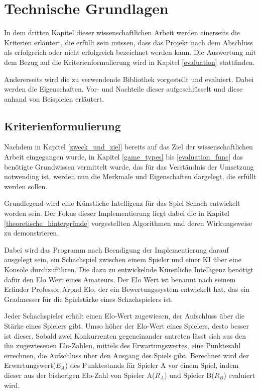
\chapter{Technische Grundlagen}
In dem dritten Kapitel dieser wissenschaftlichen Arbeit werden einerseits die Kriterien erläutert, die erfüllt sein müssen, dass das Projekt nach dem Abschluss als erfolgreich oder nicht erfolgreich bezeichnet werden kann. Die Auswertung mit dem Bezug auf die Kriterienformulierung wird in Kapitel \ref{evaluation} stattfinden.

Andererseits wird die zu verwendende Bibliothek vorgestellt und evaluiert. Dabei werden die Eigenschaften, Vor- und Nachteile dieser aufgeschlüsselt und diese anhand von Beispielen erläutert.


\section{Kriterienformulierung}\label{kriterienformulierung}
Nachdem in Kapitel \ref{zweck_und_ziel} bereits auf das Ziel der wissenschaftlichen Arbeit eingegangen wurde, in Kapitel \ref{game_types} bis \ref{evaluation_func} das benötigte Grundwissen vermittelt wurde, das für das Verständnis der Umsetzung notwending ist, werden nun die Merkmale und Eigenschaften dargelegt, die erfüllt werden sollen.

Grundlegend wird eine Künstliche Intelligenz für das Spiel Schach entwickelt worden sein. Der Fokus dieser Implementierung liegt dabei die in Kapitel \ref{theoretische_hintergründe} vorgestellten Algorithmen und deren Wirkungsweise zu demonstrieren.

Dabei wird das Programm nach Beendigung der Implementierung darauf ausgelegt sein, ein Schachspiel zwischen einem Spieler und einer KI über eine Konsole durchzuführen. Die dazu zu entwickelnde Künstliche Intelligenz benötigt dafür den Elo Wert eines Amateurs. Der Elo Wert ist benannt nach seinem Erfinder Professor Arpad Elo, der ein Bewertungssystem entwickelt hat, das ein Gradmesser für die Spielstärke eines Schachspielers ist.\cite{E.V.} 

Jeder Schachspieler erhält einen Elo-Wert zugewiesen, der Aufschluss über die Stärke eines Spielers gibt. Umso höher der Elo-Wert eines Spielers, desto besser ist dieser. Sobald zwei Konkurrenten gegeneinander antreten lässt sich aus den ihn zugewiesenen Elo-Zahlen, mittels des Erwartungswertes, eine Punktezahl errechnen, die Aufschluss über den Ausgang des Spiels gibt. 
Berechnet wird der Erwartungswert($E_{A}$) des Punktestands für Spieler A vor einem Spiel, indem dieser aus der bisherigen Elo-Zahl von Spieler A($R_{A}$) und Spieler B($R_{B}$) evaluiert wird.

